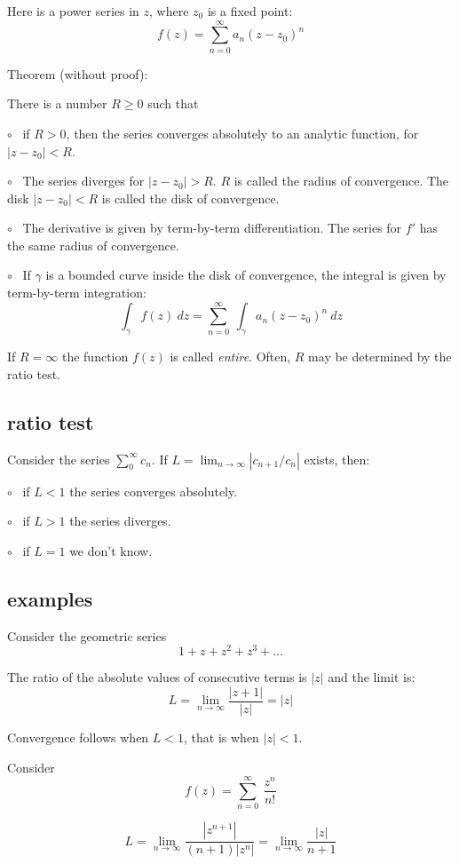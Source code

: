 \documentclass[11pt, oneside]{article}
\begin{document}
Here is a power series in $z$, where $z_0$ is a fixed point:
\[ f(z) = \sum_{n=0}^{\infty} a_n(z - z_0)^n \]

Theorem (without proof):

There is a number $R \ge 0$ such that

$\circ$ \ if $R > 0$, then the series converges absolutely to an analytic function, for $|z - z_0| < R$.

$\circ$ \ The series diverges for $|z - z_0| > R$. $R$ is called the radius of convergence. The disk $|z - z_0| < R$ is called the disk of convergence.

$\circ$ \ The derivative is given by term-by-term differentiation.  The series for $f'$ has the same radius of convergence.

$\circ$ \ If $\gamma$ is a bounded curve inside the disk of convergence, the integral is given by term-by-term integration:
\[ \int_{\gamma} f(z) \ dz = \sum_{n=0}^{\infty} \ \int_{\gamma} a_n(z - z_0)^n \ dz \]

If $R = \infty$ the function $f(z)$ is called \emph{entire}.  Often, $R$ may be determined by the ratio test.

\subsection*{ratio test}
Consider the series $\sum_0^{\infty} c_n$.  If $L = \lim_{n \rightarrow \infty} |c_{n+1}/c_n|$ exists, then:

$\circ$ \ if $L < 1$ the series converges absolutely.

$\circ$ \ if $L > 1$ the series diverges.

$\circ$ \ if $L = 1$ we don't know.

\subsection*{examples}

Consider the geometric series
\[ 1 + z + z^2 + z^3 + \dots \]

The ratio of the absolute values of consecutive terms is $|z|$ and the limit is:
\[ L = \lim_{n \rightarrow \infty} \frac{|z+1|}{|z|} = |z| \]

Convergence follows when $L < 1$, that is when $|z| < 1$.

Consider
\[ f(z) = \sum_{n=0}^{\infty} \ \frac{z^n}{n!} \]

\[ L =  \lim_{n \rightarrow \infty} \frac{|z^{n+1}|}{(n+1) |z^n|} =  \lim_{n \rightarrow \infty} \frac{|z|}{n+1} \]
\end{document}
